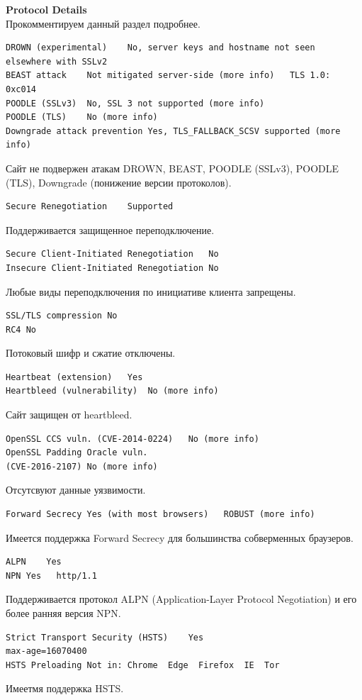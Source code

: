 \documentclass[10pt,a4paper,titlepage]{article}
\begin{document}
\textbf{Protocol Details}\\
Прокомментируем данный раздел подробнее.

\begin{verbatim}
DROWN (experimental)	No, server keys and hostname not seen elsewhere with SSLv2
BEAST attack	Not mitigated server-side (more info)   TLS 1.0: 0xc014
POODLE (SSLv3)	No, SSL 3 not supported (more info)
POODLE (TLS)	No (more info)
Downgrade attack prevention	Yes, TLS_FALLBACK_SCSV supported (more info)
\end{verbatim}
Сайт не подвержен атакам DROWN, BEAST, POODLE (SSLv3), POODLE (TLS), Downgrade (понижение версии протоколов).

\begin{verbatim}
Secure Renegotiation	Supported
\end{verbatim}
Поддерживается защищенное переподключение.

\begin{verbatim}
Secure Client-Initiated Renegotiation	No
Insecure Client-Initiated Renegotiation	No
\end{verbatim}
Любые виды переподключения по инициативе клиента запрещены.

\begin{verbatim}
SSL/TLS compression	No
RC4	No
\end{verbatim}
Потоковый шифр и сжатие отключены.

\begin{verbatim}
Heartbeat (extension)	Yes
Heartbleed (vulnerability)	No (more info)
\end{verbatim}
Сайт защищен от heartbleed.

\begin{verbatim}
OpenSSL CCS vuln. (CVE-2014-0224)	No (more info)
OpenSSL Padding Oracle vuln.
(CVE-2016-2107)	No (more info)
\end{verbatim}
Отсутсвуют данные уязвимости.

\begin{verbatim}
Forward Secrecy	Yes (with most browsers)   ROBUST (more info)
\end{verbatim}
Имеется поддержка Forward Secrecy для большинства собверменных браузеров.

\begin{verbatim}
ALPN	Yes
NPN	Yes   http/1.1
\end{verbatim}
Поддерживается протокол ALPN (Application-Layer Protocol Negotiation) и его более ранняя версия NPN.


\begin{verbatim}
Strict Transport Security (HSTS)	Yes 
max-age=16070400
HSTS Preloading	Not in: Chrome  Edge  Firefox  IE  Tor 
\end{verbatim}
Имеетмя поддержка HSTS.
\end{document}
